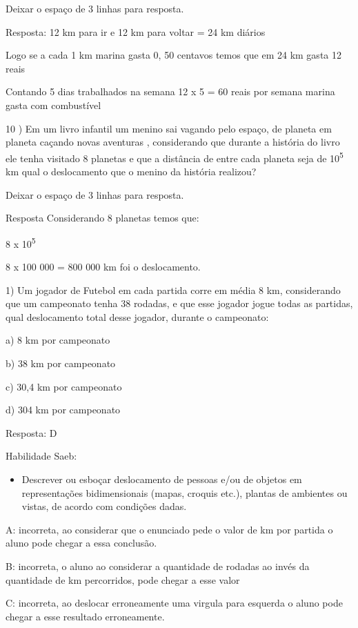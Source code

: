 {Deixar o espaço de 3 linhas para resposta.

Resposta: 12 km para ir e 12 km para voltar = 24 km diários

Logo se a cada 1 km marina gasta 0, 50 centavos temos que em 24 km gasta
12 reais

Contando 5 dias trabalhados na semana 12 x 5 = 60 reais por semana
marina gasta com combustível

10 ) Em um livro infantil um menino sai vagando pelo espaço, de planeta
em planeta caçando novas aventuras , considerando que durante a história
do livro ele tenha visitado 8 planetas e que a distância de entre cada
planeta seja de 10\textsuperscript{5} km qual o deslocamento que o
menino da história realizou?

Deixar o espaço de 3 linhas para resposta.

Resposta Considerando 8 planetas temos que:

8 x 10\textsuperscript{5}

8 x 100 000 = 800 000 km foi o deslocamento.


1) Um jogador de Futebol em cada partida corre em média 8 km,
considerando que um campeonato tenha 38 rodadas, e que esse jogador
jogue todas as partidas, qual deslocamento total desse jogador, durante
o campeonato:

a) 8 km por campeonato

b) 38 km por campeonato

c) 30,4 km por campeonato

d) 304 km por campeonato

Resposta: D

Habilidade Saeb:

\begin{itemize}
\tightlist
\item
  Descrever ou esboçar deslocamento de pessoas e/ou de objetos em
  representações bidimensionais (mapas, croquis etc.), plantas de
  ambientes ou vistas, de acordo com condições dadas.
\end{itemize}

A: incorreta, ao considerar que o enunciado pede o valor de km por
partida o aluno pode chegar a essa conclusão.

B: incorreta, o aluno ao considerar a quantidade de rodadas ao invés da
quantidade de km percorridos, pode chegar a esse valor

C: incorreta, ao deslocar erroneamente uma virgula para esquerda o aluno
pode chegar a esse resultado erroneamente.

}
